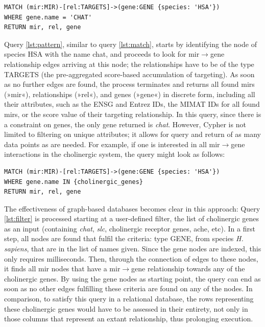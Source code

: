 \begin{lstlisting}[label=lst:pattern,caption=Patterns,
language=Cypher]
MATCH (mir:MIR)-[rel:TARGETS]->(gene:GENE {species: 'HSA'})
WHERE gene.name = 'CHAT'
RETURN mir, rel, gene
\end{lstlisting}

Query \ref{lst:pattern}, similar to query \ref{lst:match}, starts by identifying the node of species HSA with the name \ac{chat}, and proceeds to look for \ac{mir}$\to$gene relationship edges arriving at this node; the relationships have to be of the type TARGETS (the pre-aggregated score-based accumulation of targeting). As soon as no further edges are found, the process terminates and returns all found \acp{mir} (»mir«), relationships (»rel«), and genes (»gene«) in discrete form, including all their attributes, such as the ENSG and Entrez IDs, the MIMAT IDs for all found \acp{mir}, or the score value of their targeting relationship. In this query, since there is a constraint on genes, the only gene returned is \textit{\ac{chat}}. However, Cypher is not limited to filtering on unique attributes; it allows for query and return of as many data points as are needed. For example, if one is interested in all \ac{mir}$\to$gene interactions in the cholinergic system, the query might look as follows:

\begin{lstlisting}[label=lst:filter,caption=Filtering,
language=Cypher]
MATCH (mir:MIR)-[rel:TARGETS]->(gene:GENE {species: 'HSA'})
WHERE gene.name IN {cholinergic_genes}
RETURN mir, rel, gene
\end{lstlisting}

The effectiveness of graph-based databases becomes clear in this approach: Query \ref{lst:filter} is processed starting at a user-defined filter, the list of cholinergic genes as an input (containing \textit{\ac{chat}}, \textit{\ac{slc}}, cholinergic receptor genes, \acl{ache}, etc). In a first step, all nodes are found that fulfil the criteria: type GENE, from species \textit{H. sapiens}, that are in the list of names given. Since the gene nodes are indexed, this only requires milliseconds. Then, through the connection of edges to these nodes, it finds all \ac{mir} nodes that have a \ac{mir}$\to$gene relationship towards any of the cholinergic genes. By using the gene nodes as starting point, the query can end as soon as no other edges fulfilling these criteria are found on any of the nodes. In comparison, to satisfy this query in a relational database, the rows representing these cholinergic genes would have to be assessed in their entirety, not only in those columns that represent an extant relationship, thus prolonging execution.

